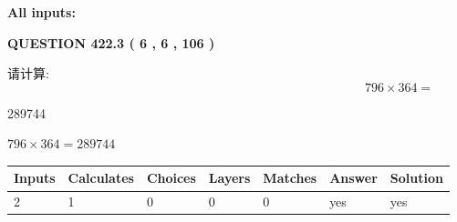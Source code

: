 \documentclass{ctexart}
\begin{document}
   
   
   
\noindent{}
   
   
   
   
\noindent\vspace{0.1in}\hspace{-0.08in} {\textbf{\Large{All inputs: }}}
   
   
  
\vspace{0.2in}
  
{\textbf{\Large{QUESTION
422.3 
 ( 6 , 6 , 106 )
}}}
  
  
 
请计算:
\begin{equation}
796  \times    %
364 = \nonumber
\end{equation}
 
 
 
\noindent{}
 
 

289744
 
 
\noindent{}
 
 

 
 
 
\noindent{}
 
 

$ %
796 \times  %
364=   %
289744$
 
 
\noindent{}
 
 

 
   
   
   
   
\noindent\begin{tabular}{|l|l|l|l|l|l|l|}
 \hline
Inputs & Calculates & Choices & Layers & Matches & Answer & Solution \\ \hline
 2  & 
 1  & 
 0
  & 
 0  & 
 0  & 
  yes & 
  yes 
  \\ \hline
 \end{tabular}
   
   
   
   
\noindent{}
   
\end{document}
